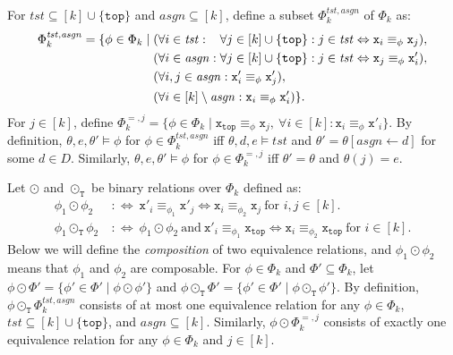 \documentclass[oribibl,envcountsame,dvipdfmx]{llncs}
\newcommand{\tst}{\mathit{tst}}
\newcommand{\asgn}{\mathit{asgn}}
\renewcommand{\top}{\mathtt{top}}
\newcommand{\Ltop}{\L_{\top}}
\renewcommand{\L}{\mathtt{x}}
\newcommand{\R}{\mathtt{x}'}
\newcommand{\COMPBL}{\odot}
\newcommand{\COMPBLT}{\COMPBL_{\mathtt{T}}}
\begin{document}
For $\tst\subseteq [k]\cup\{\top\}$ and $\asgn\subseteq [k]$,
define a subset $\Phi_k^{\tst,\asgn}$ of $\Phi_k$ as:
\[
  \Phi_k^{\tst,\asgn} = \{ \phi\in\Phi_k \mid
    \begin{aligned}[t]
      & (\forall i\in\rlap{$\tst :{}$}\hphantom{\asgn:{}}
      \forall j\in [k]\cup\{\top\} :
      j\in\tst \Leftrightarrow \L_i \equiv_{\phi} \L_j), \\
      & (\forall i\in\asgn : \forall j\in [k]\cup\{\top\} :
      j\in\tst \Leftrightarrow \L_j \equiv_{\phi} \R_i), \\
      & (\forall i,j\in\asgn :
      \R_i \equiv_{\phi} \R_j), \\
      & (\forall i\in [k]\setminus\asgn :
      \L_i \equiv_{\phi} \R_i)\}.
    \end{aligned}
\]
For $j\in[k]$, define
$
  \Phi_k^{=,j} = \{ \phi\in\Phi_k \mid
    \Ltop \equiv_{\phi} \L_j, \
    \forall i\in[k] : \L_i \equiv_{\phi} \R_i \}
$.
By definition,
$\theta,e,\theta'\models\phi$ for
$\phi\in\Phi_k^{\tst,\asgn}$
iff
$\theta,d,e\models\tst$ and
$\theta'=\theta[\asgn\gets d]$ for some $d\in D$.
Similarly,
$\theta,e,\theta'\models\phi$ for
$\phi\in\Phi_k^{=,j}$
iff
$\theta'=\theta$ and $\theta(j)=e$.

Let $\COMPBL$ and $\COMPBLT$ be binary relations over $\Phi_k$ defined as:
\begin{align*}
  \phi_1\COMPBL\phi_2 \ &:\Leftrightarrow \
      \R_i \equiv_{\phi_1} \R_j \Leftrightarrow \L_i \equiv_{\phi_2} \L_j
      \ \text{for } i,j\in[k].
  \\
%
  \phi_1\COMPBLT\phi_2 \ &:\Leftrightarrow \
      \phi_1\COMPBL\phi_2 \ \text{and} \
      \R_i \equiv_{\phi_1} \Ltop \Leftrightarrow \L_i \equiv_{\phi_2} \Ltop
      \ \text{for } i\in[k].
\end{align*}
Below we will define the \emph{composition} of two equivalence relations,
and $\phi_1\COMPBL\phi_2$ means that
$\phi_1$ and $\phi_2$ are composable.
%
For $\phi\in\Phi_k$ and $\Phi'\subseteq\Phi_k$,
let $\phi\COMPBL\Phi' = \{\phi'\in\Phi' \mid \phi\COMPBL\phi'\}$
and $\phi\COMPBLT\Phi' = \{\phi'\in\Phi' \mid \phi\COMPBLT\phi'\}$.
By definition,
$\phi\COMPBLT\Phi_k^{\tst,\asgn}$ consists of at most one equivalence relation
for any $\phi\in\Phi_k$, $\tst\subseteq [k]\cup\{\top\}$,
and $\asgn\subseteq[k]$.
Similarly,
$\phi\COMPBL\Phi_k^{=,j}$ consists of exactly one equivalence relation
for any $\phi\in\Phi_k$ and $j\in [k]$.
\end{document}
